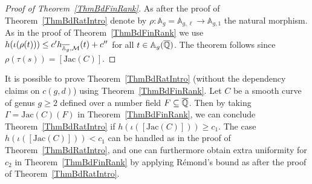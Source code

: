 \begin{proof}[Proof of Theorem~\ref{ThmBdFinRank}]
  As after the proof of Theorem~\ref{ThmBdRatIntro}
  denote by $\rho \colon \mathbb{A}_g = \mathbb{A}_{g,\ell}
  \rightarrow \mathbb{A}_{g,1}$ the natural morphism.
  As in the proof of Theorem~\ref{ThmBdFinRank} we use
  $h(\iota(\rho(t)))\le c'h_{\overline{{\mathbb{A}}_{g}},{\mathcal M}}(t)  + c''$ for all $t\in
  \mathbb{A}_g({\overline{\mathbb{Q}}})$.
  The theorem follows since $\rho(\tau(s)) = [\mathrm{Jac}(C)]$.
\end{proof}
\begin{remark}
It is possible to prove Theorem~\ref{ThmBdRatIntro} (without the
dependency claims on $c(g,d)$) using
Theorem~\ref{ThmBdFinRank}. Let $C$ be a smooth curve of genus $g \ge
2$ defined over a number field $F \subseteq {\overline{\mathbb{Q}}}$. Then by taking $\Gamma =
\mathrm{Jac}(C)(F)$ in Theorem~\ref{ThmBdFinRank}, we can conclude
Theorem~\ref{ThmBdRatIntro} if $h(\iota([\mathrm{Jac}(C)])) \ge c_1$. 
  The case $h(\iota([\mathrm{Jac}(C)])) < c_1$ can be 
  handled as in the
  proof of Theorem~\ref{ThmBdRatIntro}, and one can furthermore obtain 
  extra uniformity
  for $c_2$ in Theorem~\ref{ThmBdFinRank} by applying R\'emond's bound
  \cite[page~643]{DPvarabII} as after the proof of Theorem~\ref{ThmBdRatIntro}.%
\end{remark}

